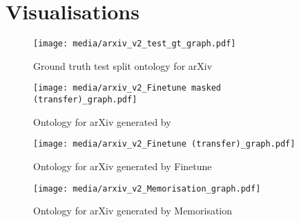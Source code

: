 \newpage

\chapter{Visualisations} \label{appendix:visualisation}


\begin{figure}[h]
    \centering
    \texttt{[image: media/arxiv\_v2\_test\_gt\_graph.pdf]}
    \caption{Ground truth test split ontology for arXiv}
\end{figure}


\begin{figure}[h]
    \centering
    \texttt{[image: media/arxiv\_v2\_Finetune masked (transfer)\_graph.pdf]}
    \caption{Ontology for arXiv generated by \name}
\end{figure}


\begin{figure}[h]
    \centering
    \texttt{[image: media/arxiv\_v2\_Finetune (transfer)\_graph.pdf]}
    \caption{Ontology for arXiv generated by Finetune}
\end{figure}


\begin{figure}[h]
    \centering
    \texttt{[image: media/arxiv\_v2\_Memorisation\_graph.pdf]}
    \caption{Ontology for arXiv generated by Memorisation}
\end{figure}


